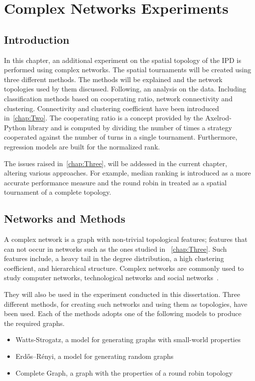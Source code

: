 \chapter{Complex Networks Experiments}
\label{chap:Four}

\section{Introduction}
In this chapter, an additional experiment on the spatial topology of the IPD
is performed using complex networks. The spatial tournaments will be created using
three different methods. The methods will be explained and the network topologies used by them
discussed. Following, an analysis on the data. Including classification methods
based on cooperating ratio, network connectivity and clustering. Connectivity and
clustering coefficient have been introduced in~\autoref{chap:Two}. The cooperating
ratio is a concept provided by the Axelrod-Python library and is computed
by dividing the number of times a strategy cooperated against the number of turns
in a single tournament. Furthermore, regression models are built for the normalized rank.

The issues raised in~\autoref{chap:Three}, will be addessed in the current chapter,
altering various approaches. For example, median ranking is introduced as a more
accurate performance measure and the round robin in treated as a spatial tournament
of a complete topology.

\section{Networks and Methods}
\label{sub:methods}
A complex network is a graph with non-trivial topological features;
features that can not occur in networks such as the ones studied in ~\autoref{chap:Three}.
Such features include, a heavy tail in the degree distribution, a high
clustering coefficient, and hierarchical structure. Complex networks are commonly
used to study computer networks, technological networks and social networks~\cite{VanDerHofstad2009}.

They will also be used in the experiment conducted in this dissertation. Three
different methods, for creating such networks and using them as topologies, have
been used. Each of the methods adopts one of the following models to produce the
required graphs.

\begin{itemize}
	\item Watts-Strogatz, a model for generating graphs with small-world properties\cite{Watts1998}
	\item Erdős–Rényi, a model for generating random graphs~\cite{Erdos1959}
	\item Complete Graph, a graph with the properties of a round robin topology\cite{Harris2010}
\end{itemize}

